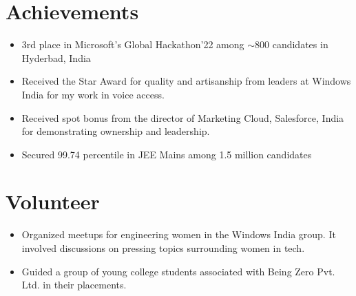 \documentclass[letterpaper,11pt]{article}
\newcommand{\listItem}[1]{
  \item\small{{#1 \vspace{-2pt}}
  }
}
\newcommand{\resumeSubHeadingListStart}{\begin{itemize}[leftmargin=*]}
\newcommand{\resumeSubHeadingListEnd}{\end{itemize}}
\newcommand{\resumeListItem}[1]{\listItem{#1}\vspace{-4pt}}
\begin{document}
\section{Achievements}
 \resumeSubHeadingListStart
   \resumeListItem
      {3rd place in Microsoft's Global Hackathon'22 among  $\sim$800 candidates in Hyderbad, India}
   \resumeListItem
      {Received the Star Award for quality and artisanship from leaders at Windows India for my work in voice access.}
    \resumeListItem
      {Received spot bonus from the director of Marketing Cloud, Salesforce, India for demonstrating ownership and leadership.}
    \resumeListItem
      {Secured 99.74 percentile in JEE Mains among 1.5 million candidates}
 \resumeSubHeadingListEnd
 
 
\section{Volunteer}
 \resumeSubHeadingListStart
   \resumeListItem
      {Organized meetups for engineering women in the Windows India group. It involved discussions on pressing topics surrounding women in tech.}
    \resumeListItem
      {Guided a group of young college students associated with Being Zero Pvt. Ltd. in their placements.}
 \resumeSubHeadingListEnd
 
 
\end{document}
